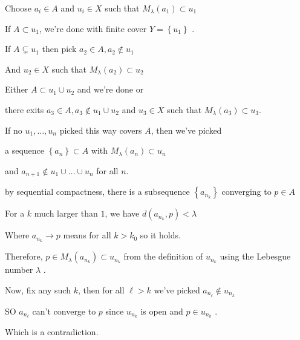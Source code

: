 \documentclass{report}
\begin{document}
{{		Choose \(a_{i} \in A\) and \(u_{i} \in X\) such that \(M_{\lambda}(a_{1}) \subset u_1\)

		If \(A \subset u_1\), we're done with finite cover \(Y = \left\{ u_1 \right\} \) .

		If \(A \subsetneq u_1\) then pick \(a_2 \in A, a_2 \notin u_1\)

		And \(u_2 \in X\) such that \(M_{\lambda}(a_2) \subset u_2\)

		Either \(A \subset u_1 \cup u_2\) and we're done or

		there exits \(a_3 \in A, a_3 \notin u_1 \cup u_2\) and \(u_3 \in X\) such that \(M_{\lambda}(a_3) \subset u_3\).

		If no \(u_1, \ldots, u_{n}\) picked this way covers \(A\), then we've picked

		a sequence \(\left\{ a_{n} \right\} \subset A\) with \(M_{\lambda}(a_{n}) \subset u_{n}\)

		and \(a_{n+1} \notin u_1 \cup \ldots \cup u_{n}\) for all \(n\).

		by sequential compactness, there is a subsequence \(\left\{ a_{n_{k}} \right\} \) converging to \(p \in A\)

		For a \(k\) much larger than \(1\), we have \(d(a_{n_{k}}, p) < \lambda\)

		Where \(a_{n_{k}} \to p\) means for all \(k > k_{0}\) so it holds.

		Therefore, \(p \in M_{\lambda}(a_{n_{k}}) \subset u_{n_{k}}\) from the definition of \(u_{n_{k}}\) using the Lebesgue number \(\lambda\) .

		Now, fix any such \(k\), then for all \(\ell > k\) we've picked \(a_{n_{\ell}} \notin u_{n_{k}}\)

		SO \(a_{n_{\ell}}\) can't converge to \(p\) since \(u_{n_{k}}\) is open and \(p \in u_{n_{k}}\) .

		Which is a contradiction.
	}
}
\end{document}
